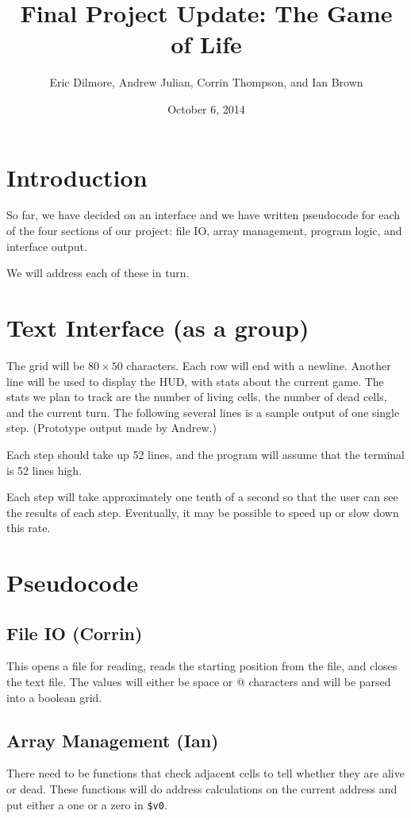 \documentclass[12pt]{article}
\author{Eric Dilmore, Andrew Julian, Corrin Thompson, and Ian Brown}
\title{Final Project Update: The Game of Life}
\date{October 6, 2014}
\begin{document}
  \maketitle

  \section{Introduction}
  So far, we have decided on an interface and we have written pseudocode for
  each of the four sections of our project: file IO, array management, program
  logic, and interface output.

  We will address each of these in turn.

  \section{Text Interface (as a group)}
  \label{s:interface}
  The grid will be \(80 \times 50\) characters. Each row will end with a
  newline. Another line will be used to display the HUD, with stats about the
  current game. The stats we plan to track are the number of living cells, the
  number of dead cells, and the current turn. The following several lines is a
  sample output of one single step. (Prototype output made by Andrew.)

  

  Each step should take up 52 lines, and the program will assume that the
  terminal is 52 lines high.

  Each step will take approximately one tenth of a second so that the user can
  see the results of each step. Eventually, it may be possible to speed up or
  slow down this rate.

  \section{Pseudocode}
  \subsection{File IO (Corrin)}
  This opens a file for reading, reads the starting position from the file, and
  closes the text file. The values will either be space or @ characters and will
  be parsed into a boolean grid.

  

  \subsection{Array Management (Ian)}
  There need to be functions that check adjacent cells to tell whether they are
  alive or dead. These functions will do address calculations on the current
  address and put either a one or a zero in \verb-$v0-.
\end{document}
